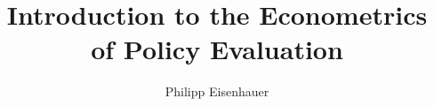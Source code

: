

\title{Introduction to the Econometrics of Policy Evaluation}
\author{Philipp Eisenhauer}

\date{}

\let\otp\titlepage
